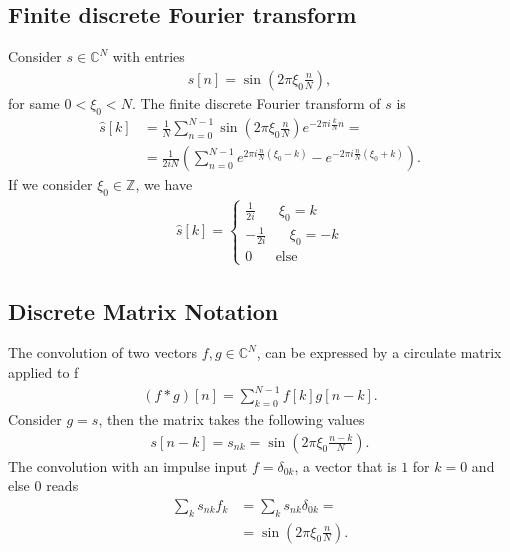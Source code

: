 \subsection{Finite discrete Fourier transform}
Consider $s\in \mathbb{C}^N$ with entries
\begin{align}
    s[n] = \sin\left(2\pi\xi_0\frac{n}{N}\right),
\end{align}
for same $0 < \xi_0 < N$. The finite discrete Fourier transform of $s$ is
\begin{align}
    \hat{s}[k] &= \frac{1}{N} \sum_{n=0}^{N-1} \sin\left(2\pi\xi_0\frac{n}{N}\right)
            e^{-2\pi i \frac{k}{N} n}  =\\
        &=\frac{1}{2iN}\left(
            \sum_{n=0}^{N-1}e^{2\pi i \frac{n}{N}(\xi_0 -k)} - e^{-2\pi i
            \frac{n}{N}(\xi_0 +k)}
            \right).
\end{align}
If we consider $\xi_0 \in \mathbb{Z}$, we have
\begin{align}
    \hat{s}[k] =
    \begin{cases}
        \frac{1}{2i}\;\;\;\;\;\; \xi_0 = k\\
        -\frac{1}{2i}\;\;\;\;\;\; \xi_0 = -k\\
        0   \;\;\;\;\;\; \text{else}
    \end{cases}
\end{align}
\subsection{Discrete Matrix Notation}
The convolution of two vectors $f, g \in \mathbb{C}^N$, can be expressed by a
circulate matrix applied to f
\begin{align}
    (f * g) [n] = \sum_{k=0}^{N-1} f[k] g[n-k].
\end{align}
Consider $g=s$, then the matrix takes the following values
\begin{align}
    s[n-k] = s_{nk} = \sin\left(2\pi \xi_0 \frac{n-k}{N}\right).
\end{align}
The convolution with an impulse input $f=\delta_{0k}$, a vector that is $1$
for $k=0$ and else 0 reads
\begin{align}
    \sum_k s_{nk}f_k &= \sum_k s_{nk} \delta_{0k} =\\
            &= \sin\left(2\pi \xi_0 \frac{n}{N}\right).
\end{align}


